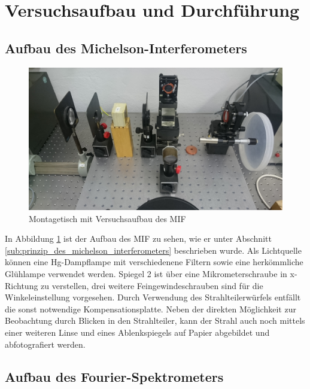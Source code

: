 \section{Versuchsaufbau und Durchführung} %
\label{sec:versuchsaufbau_und_durchf_hrung}

	\subsection{Aufbau des Michelson-Interferometers} %
	\label{sub:aufbau_des_michelson_interferometers}

	\begin{figure}[htb]
		\centering
		\includegraphics[scale = 0.08]{images/DSC_1011.JPG}
		\caption{Montagetisch mit Versuchsaufbau des MIF}
		\label{fig:aufbau-mif-1}
	\end{figure}

	In Abbildung \ref{fig:aufbau-mif-1} ist der Aufbau des MIF zu sehen, wie er unter Abschnitt \ref{sub:prinzip_des_michelson_interferometers} beschrieben wurde.
	Als Lichtquelle können eine Hg-Dampflampe mit verschiedenene Filtern sowie eine herkömmliche Glühlampe verwendet werden.
	Spiegel 2 ist über eine Mikrometerschraube in x-Richtung zu verstellen, drei weitere Feingewindeschrauben sind für die Winkeleinstellung vorgesehen.
	Durch Verwendung des Strahlteilerwürfels entfällt die sonst notwendige Kompensationsplatte.
	Neben der direkten Möglichkeit zur Beobachtung durch Blicken in den Strahlteiler, kann der Strahl auch noch mittels einer weiteren Linse und eines Ablenkspiegels auf Papier abgebildet und abfotografiert werden.
	


	\subsection{Aufbau des Fourier-Spektrometers} %
	\label{sub:aufabu_des_fourier_spektrometers}
	

